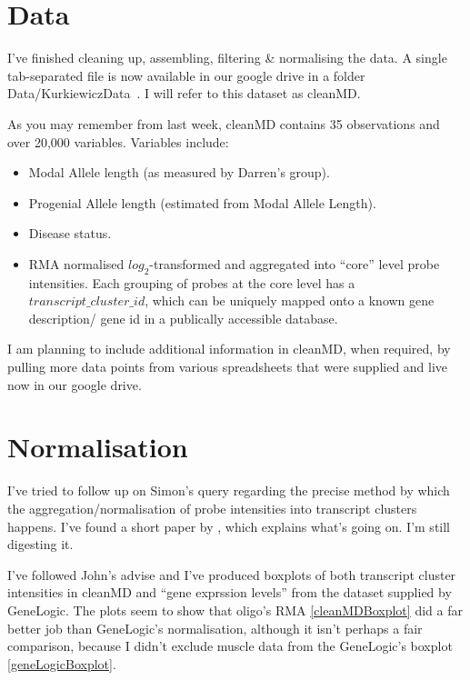 \documentclass[12pt]{article}
\begin{document}
\maketitle

\section{Data}

I've finished cleaning up, assembling, filtering \& normalising the data. A single tab-separated file is now available in our google drive in a folder Data/KurkiewiczData~\parencite{GoogleDrive}. I will refer to this dataset as cleanMD.

As you may remember from last week, cleanMD contains 35 observations and over 20,000 variables. Variables include:
\begin{itemize}
  \item Modal Allele length (as measured by Darren's group).
  \item Progenial Allele length (estimated from Modal Allele Length).
  \item Disease status.
  \item RMA normalised $log_{2}$-transformed and aggregated into ``core'' level probe intensities. Each grouping of probes at the core level has a $transcript\_cluster\_id$, which can be uniquely mapped onto a known gene description/ gene id in a publically accessible database.
\end{itemize}

I am planning to include additional information in cleanMD, when required, by pulling more data points from various spreadsheets that were supplied and live now in our google drive.

\section{Normalisation}

I've tried to follow up on Simon's query regarding the precise method by which the aggregation/normalisation of probe intensities into transcript clusters happens. I've found a short paper by \cite{fRMA}, which explains what's going on. I'm still digesting it.

I've followed John's advise and I've produced boxplots of both transcript cluster intensities in cleanMD and ``gene exprssion levels'' from the dataset supplied by GeneLogic. The plots seem to show that oligo's RMA \ref{cleanMDBoxplot} did a far better job than GeneLogic's normalisation, although it isn't perhaps a fair comparison, because I didn't exclude muscle data from the GeneLogic's boxplot \ref{geneLogicBoxplot}.
\end{document}

